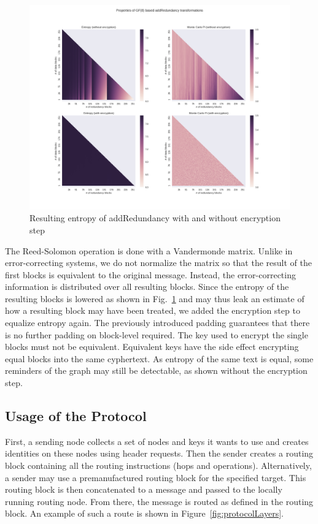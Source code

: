 \documentclass[acmsmall, screen, review]{acmart}
\begin{document}
	\begin{figure}[ht]\centering
		\includegraphics[width=1\columnwidth]{randomblock_10kb}
		\caption{Resulting entropy of addRedundancy with and without encryption step}
		\label{fig:entropy}
	\end{figure}
	
	
	The Reed-Solomon operation is done with a Vandermonde matrix. Unlike in error-correcting systems, we do not normalize the matrix so that the result of the first blocks is equivalent to the original message. Instead, the error-correcting information is distributed over all resulting blocks. Since the entropy of the resulting blocks is lowered as shown in Fig.~\ref{fig:entropy} and may thus leak an estimate of how a resulting block may have been treated, we added the encryption step to equalize entropy again. The previously introduced padding guarantees that there is no further padding on block-level required. The key used to encrypt the single blocks must not be equivalent. Equivalent keys have the side effect encrypting equal blocks into the same cyphertext. As entropy of the same text is equal, some reminders of the graph may still be detectable, as shown without the encryption step.
	
	\subsection{Usage of the Protocol}
	First, a sending node collects a set of nodes and keys it wants to use and creates identities on these nodes using header requests. Then the sender creates a routing block containing all the routing instructions (hops and operations). Alternatively, a sender may use a premanufactured routing block for the specified target. This routing block is then concatenated to a message and passed to the locally running routing node. From there, the message is routed as defined in the routing block. An example of such a route is shown in Figure~\ref{fig:protocolLayers}.
	
\end{document}
